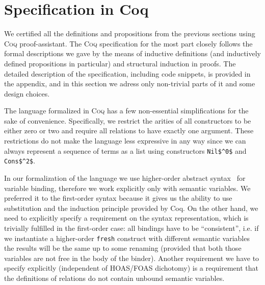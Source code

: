 \section{Specification in Coq}
\label{specification}

We certified all the definitions and propositions from the previous sections using \textsc{Coq} proof-assistant. The \textsc{Coq} specification for the most part closely follows the formal descriptions we gave by the means of inductive definitions (and inductively defined propositions in particular) and structural induction in proofs. The detailed description of the specification, including code snippets, is provided in the appendix, and in this section we adress only non-trivial parts of it and some design choices.

The language formalized in \textsc{Coq} has a few non-essential simplifications for the sake of convenience. Specifically, we restrict the arities of all constructors to be either zero or two and require all relations to have exactly one argument. These restrictions do not make the language less expressive in any way since we can always represent a sequence of terms as a list using constructors \lstinline|Nil$^0$| and \lstinline|Cons$^2$|. 

In our formalization of the language we use higher-order abstract syntax~\cite{HOAS} for variable binding, therefore we work explicitly only with semantic variables. We preferred it to the first-order syntax because it gives us the ability to use substitution and the induction principle provided by Coq. On the other hand, we need to explicitly specify a requirement on the syntax representation, which is trivially fulfilled in the first-order case: all bindings have to be ``consistent'', i.e. if we instantiate a higher-order \lstinline|fresh| construct with different semantic variables the results will be the same up to some renaming (provided that both those variables are not free in the body of the binder). Another requirement we have to specify explicitly (independent of HOAS/FOAS dichotomy) is a requirement that the definitions of relations do not contain unbound semantic variables.

